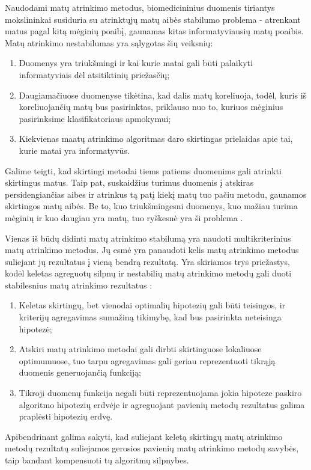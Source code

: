 Naudodami matų atrinkimo metodus, biomedicininius duomenis tiriantys mokslininkai susiduria su atrinktųjų matų aibės stabilumo problema - atrenkant matus pagal kitą mėginių poaibį, gaunamas kitas informatyviausių matų poaibis. Matų atrinkimo nestabilumas yra sąlygotas šių veiksnių:
\begin{enumerate}
 \item Duomenys yra triukšmingi ir kai kurie matai gali būti palaikyti informatyviais dėl atsitiktinių priežasčių;
 \item Daugiamačiuose duomenyse tikėtina, kad dalis matų koreliuoja, todėl, kuris iš koreliuojančių matų bus pasirinktas, priklauso nuo to, kuriuos mėginius pasirinksime klasifikatoriaus apmokymui;
 \item Kiekvienas maatų atrinkimo algoritmas daro skirtingas prielaidas apie tai, kurie matai yra informatyvūs.
\end{enumerate}
Galime teigti, kad skirtingi metodai tiems patiems duomenims gali atrinkti skirtingus matus. Taip pat, suskaidžius turimus duomenis į atskiras persidengiančias aibes ir atrinkus tą patį kiekį matų tuo pačiu metodu, gaunamos skirtingos matų aibės. Be to, kuo triukšmingesni duomenys, kuo mažiau turima mėginių ir kuo daugiau yra matų, tuo ryškesnė yra ši problema \cite{loscalzo2009consensus}. 

Vienas iš būdų didinti matų atrinkimo stabilumą yra naudoti multikriterinius matų atrinkimo metodus. Jų esmė yra panaudoti kelis matų atrinkimo metodus suliejant jų rezultatus į vieną bendrą rezultatą. Yra skiriamos trys priežastys, kodėl keletas agreguotų silpnų ir nestabilių matų atrinkimo metodų gali duoti stabilesnius matų atrinkimo rezultatus \cite{dietterich2000ensemble}:
\begin{enumerate}
 \item Keletas skirtingų, bet vienodai optimalių hipotezių gali būti teisingos, ir kriterijų agregavimas sumažiną tikimybę, kad bus pasirinkta neteisinga  hipotezė;
 \item Atskiri matų atrinkimo metodai gali dirbti skirtinguose lokaliuose optimumuose, tuo tarpu agregavimas gali geriau reprezentuoti tikrąją  duomenis generuojančią funkciją;
 \item Tikroji duomenų funkcija negali būti reprezentuojama jokia hipoteze paskiro algoritmo hipotezių erdvėje ir agreguojant pavienių metodų rezultatus galima praplėsti hipotezių erdvę.
\end{enumerate}
Apibendrinant galima sakyti, kad suliejant keletą skirtingų matų atrinkimo metodų rezultatų suliejamos gerosios pavienių matų atrinkimo metodų savybės, taip bandant kompensuoti tų algoritmų silpnybes.

